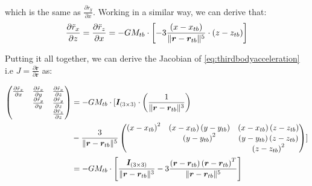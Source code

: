 which is the same as $\frac{\partial \ddot{r}_y}{\partial x}$. Working in a similar 
way, we can derive that:
\begin{equation}\label{eq:thirdbodyaccelerationgradxz}
  \frac{\partial \ddot{r}_x}{\partial z} = \frac{\partial \ddot{r}_z}{\partial x} = 
   -GM_{tb} \cdot \left[ - 3 \frac{\left(x - x_{tb}\right)}{\lVert\bm{r}-\bm{r}_{tb}\rVert^{5}} \cdot \left(z - z_{tb}\right) \right]
\end{equation}

Putting it all together, we can derive the Jacobian of \autoref{eq:thirdbodyacceleration} 
i.e $J=\frac{\partial \ddot{\bm{r}}}{\partial \bm{r}}$ as: 

\begin{equation}\label{eq:thirdbodyaccelerationgrad}
  \begin{aligned}
  \begin{pmatrix} \frac{\partial \ddot{r}_x}{\partial x} & \frac{\partial \ddot{r}_x}{\partial y} & \frac{\partial \ddot{r}_x}{\partial z} \\
                                                         & \frac{\partial \ddot{r}_y}{\partial y} & \frac{\partial \ddot{r}_y}{\partial z} \\
                                                         &                                        & \frac{\partial \ddot{r}_z}{\partial z} \\
  \end{pmatrix}
  & = -GM_{tb} \cdot [ \bm{I}_{(3\times 3)} \cdot \left( \frac{1}{\lVert\bm{r}-\bm{r}_{tb}\rVert^{3}} \right) \\
  & -\frac{3}{\lVert\bm{r}-\bm{r}_{tb}\rVert^{5}} 
  \begin{pmatrix} \left(x - x_{tb}\right)^2 & \left(x - x_{tb}\right)\left(y - y_{tb}\right) & \left(x - x_{tb}\right)\left(z - z_{tb}\right) \\
                                            & \left(y - y_{tb}\right)^2 & \left(y - y_{tb}\right)\left(z - z_{tb}\right) \\
                                            &                           & \left(z - z_{tb}\right)^2 \\
  \end{pmatrix} ] \\
  &= -GM_{tb} \cdot \left[ \frac{\bm{I}_{(3\times 3)}}{\lVert\bm{r}-\bm{r}_{tb}\rVert^{3}} - 3\frac{\left(\bm{r}-\bm{r}_{tb}\right)\left(\bm{r}-\bm{r}_{tb}\right)^T}{\lVert\bm{r}-\bm{r}_{tb}\rVert^{5}} \right] \\
  \end{aligned}
\end{equation}
